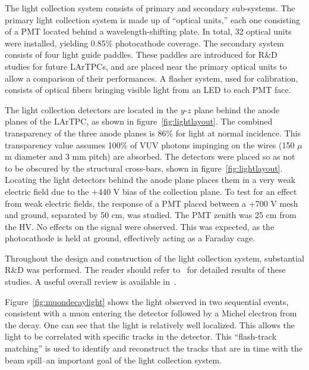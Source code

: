 The light collection system consists of primary and secondary sub-systems.  The primary light collection system is made up of ``optical units,'' each one consisting of a PMT located behind a wavelength-shifting plate.  In total, 32 optical units were installed, yielding 0.85\% photocathode coverage.  The secondary system consists of four light guide paddles.   These paddles are introduced for R\&D studies for future LArTPCs, and are placed near the primary optical units to allow a comparison of their performances.  A flasher system, used for calibration, consists of optical fibers bringing visible light from an LED to each PMT face.

The light collection detectors are located in the $y$-$z$ plane behind the anode planes of the LArTPC, as shown in figure~\ref{fig:lightlayout}.  The combined transparency of the three anode planes is 86\% for light at normal incidence.  This transparency value assumes 100$\%$ of VUV photons impinging on the wires (150 $\mu$m diameter and 3 mm pitch) are absorbed.  The detectors were placed so as not to be obscured by the \lartpc structural cross-bars, shown in figure~\ref{fig:lightlayout}.  Locating the light detectors behind the anode plane places them in a very weak electric field due to the +440 V bias of the collection plane.  To test for an effect from weak electric fields, the response of a PMT placed between a +700 V mesh and ground, separated by 50 cm, was studied.  The PMT zenith was 25 cm from the HV.   No effects on the signal were observed.  This was expected, as the photocathode is held at ground, effectively acting as a Faraday cage.  

Throughout the design and construction of the light collection system,  substantial R\&D was performed.   The reader should refer to~\cite{Jones:2013bca,Bugel:2011xg,Katori:2011uq,Chiu:2012,Baptista:2012,Briese:2013wua,Jones:2013mfa,Katori:2013wqa,Moss:2014ota,Conrad:2015xta,Moss:2015hha} for detailed results of these studies.    A useful overall review is available in~\cite{Jones:2015bya}. 

Figure~\ref{fig:muondecaylight} shows the light observed in two sequential events, consistent with a muon entering the detector followed by a Michel electron from the decay.   One can see that the light is relatively well localized.   This allows the light to be correlated with specific tracks in the detector.  This ``flash-track matching'' is used to identify and reconstruct the tracks that are in time with the beam spill--an important goal of the light collection system.


